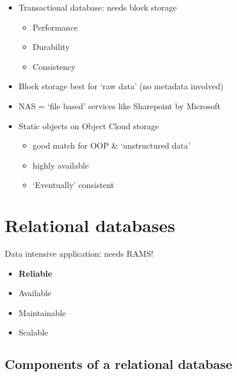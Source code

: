 \documentclass{article}
\begin{document}
\begin{itemize}
    \item Transactional database: needs block storage
    \begin{itemize}
        \item Performance
        \item Durability
        \item Consistency
    \end{itemize}
    \item Block storage best for `raw data' (no metadata involved)
    \item NAS = `file based' services like Sharepoint by Microsoft
    \item Static objects on Object Cloud storage
    \begin{itemize}
        \item good match for OOP \& `unstructured data'
        \item highly available
        \item `Eventually' consistent
    \end{itemize}
\end{itemize}

\section{Relational databases}

Data intensive application: needs RAMS!

\begin{itemize}
    \item \textbf{Reliable}
    \item Available
    \item Maintainable
    \item Scalable
\end{itemize}

\subsection{Components of a relational database}
\end{document}
